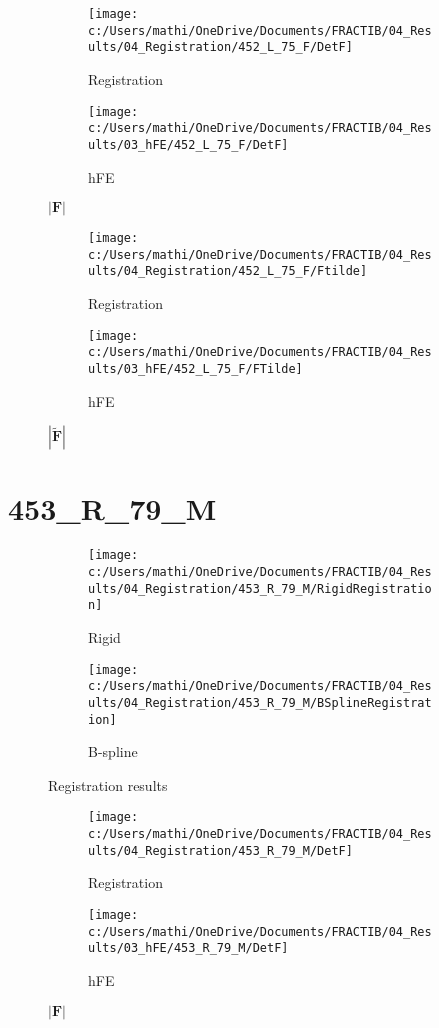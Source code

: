 \documentclass{article}%
\begin{document}
\begin{figure}[h!]%
\begin{subfigure}[b]{0.5\linewidth}%
\texttt{[image: c:/Users/mathi/OneDrive/Documents/FRACTIB/04\_Results/04\_Registration/452\_L\_75\_F/DetF]}%
\caption{Registration}%
\end{subfigure}%
\begin{subfigure}[b]{0.5\linewidth}%
\texttt{[image: c:/Users/mathi/OneDrive/Documents/FRACTIB/04\_Results/03\_hFE/452\_L\_75\_F/DetF]}%
\caption{hFE}%
\end{subfigure}%
\caption{$|\mathbf{F}|$}%
\end{figure}

%


\begin{figure}[h!]%
\begin{subfigure}[b]{0.5\linewidth}%
\texttt{[image: c:/Users/mathi/OneDrive/Documents/FRACTIB/04\_Results/04\_Registration/452\_L\_75\_F/Ftilde]}%
\caption{Registration}%
\end{subfigure}%
\begin{subfigure}[b]{0.5\linewidth}%
\texttt{[image: c:/Users/mathi/OneDrive/Documents/FRACTIB/04\_Results/03\_hFE/452\_L\_75\_F/FTilde]}%
\caption{hFE}%
\end{subfigure}%
\caption{$|\widetilde{\mathbf{F}}|$}%
\end{figure}

%
\newpage%
\section*{453\_R\_79\_M}%
\label{sec:453R79M}%


\begin{figure}[h!]%
\begin{subfigure}[b]{0.5\linewidth}%
\texttt{[image: c:/Users/mathi/OneDrive/Documents/FRACTIB/04\_Results/04\_Registration/453\_R\_79\_M/RigidRegistration]}%
\caption{Rigid}%
\end{subfigure}%
\begin{subfigure}[b]{0.5\linewidth}%
\texttt{[image: c:/Users/mathi/OneDrive/Documents/FRACTIB/04\_Results/04\_Registration/453\_R\_79\_M/BSplineRegistration]}%
\caption{B{-}spline}%
\end{subfigure}%
\caption{Registration results}%
\end{figure}

%


\begin{figure}[h!]%
\begin{subfigure}[b]{0.5\linewidth}%
\texttt{[image: c:/Users/mathi/OneDrive/Documents/FRACTIB/04\_Results/04\_Registration/453\_R\_79\_M/DetF]}%
\caption{Registration}%
\end{subfigure}%
\begin{subfigure}[b]{0.5\linewidth}%
\texttt{[image: c:/Users/mathi/OneDrive/Documents/FRACTIB/04\_Results/03\_hFE/453\_R\_79\_M/DetF]}%
\caption{hFE}%
\end{subfigure}%
\caption{$|\mathbf{F}|$}%
\end{figure}
\end{document}
